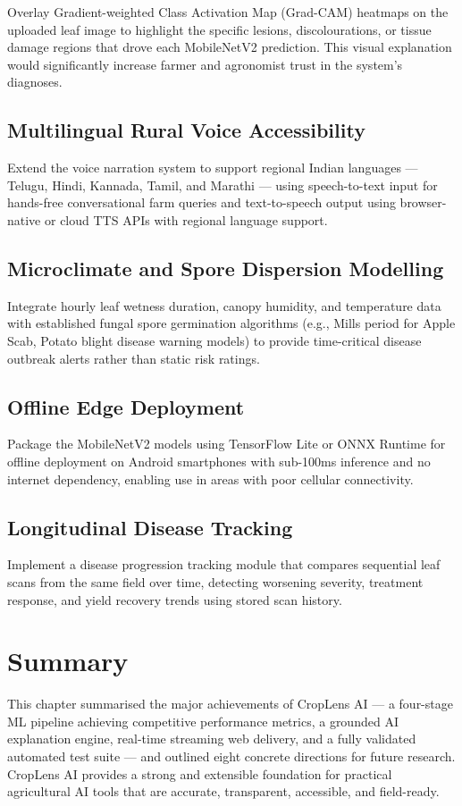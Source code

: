 Overlay Gradient-weighted Class Activation Map (Grad-CAM) heatmaps on the uploaded leaf image to highlight the specific lesions, discolourations, or tissue damage regions that drove each MobileNetV2 prediction. This visual explanation would significantly increase farmer and agronomist trust in the system's diagnoses.

\subsection{Multilingual Rural Voice Accessibility}

Extend the voice narration system to support regional Indian languages --- Telugu, Hindi, Kannada, Tamil, and Marathi --- using speech-to-text input for hands-free conversational farm queries and text-to-speech output using browser-native or cloud TTS APIs with regional language support.

\subsection{Microclimate and Spore Dispersion Modelling}

Integrate hourly leaf wetness duration, canopy humidity, and temperature data with established fungal spore germination algorithms (e.g., Mills period for Apple Scab, Potato blight disease warning models) to provide time-critical disease outbreak alerts rather than static risk ratings.

\subsection{Offline Edge Deployment}

Package the MobileNetV2 models using TensorFlow Lite or ONNX Runtime for offline deployment on Android smartphones with sub-100ms inference and no internet dependency, enabling use in areas with poor cellular connectivity.

\subsection{Longitudinal Disease Tracking}

Implement a disease progression tracking module that compares sequential leaf scans from the same field over time, detecting worsening severity, treatment response, and yield recovery trends using stored scan history.

\section{Summary}

This chapter summarised the major achievements of CropLens AI --- a four-stage ML pipeline achieving competitive performance metrics, a grounded AI explanation engine, real-time streaming web delivery, and a fully validated automated test suite --- and outlined eight concrete directions for future research. CropLens AI provides a strong and extensible foundation for practical agricultural AI tools that are accurate, transparent, accessible, and field-ready.

